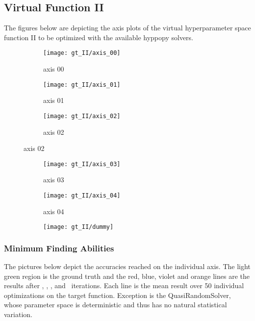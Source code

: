 \subsection{Virtual Function II}
The figures below are depicting the axis plots of the virtual hyperparameter space function II to be optimized with the available hyppopy solvers. 
\begin{figure}[h]
	\begin{subfigure}{0.32\textwidth}
		\texttt{[image: gt\_II/axis\_00]} 
		\caption{axis 00}
		\label{fig:axis00_II}
	\end{subfigure}
	\begin{subfigure}{0.32\textwidth}
		\texttt{[image: gt\_II/axis\_01]}
		\caption{axis 01}
		\label{fig:axis01_II}
	\end{subfigure}
	\begin{subfigure}{0.32\textwidth}
		\texttt{[image: gt\_II/axis\_02]}
		\caption{axis 02}
		\label{fig:axis02_II}
	\end{subfigure}
\end{figure}

\begin{figure}[h]
	\begin{subfigure}{0.32\textwidth}
		\texttt{[image: gt\_II/axis\_03]} 
		\caption{axis 03}
		\label{fig:axis03_II}
	\end{subfigure}
	\begin{subfigure}{0.32\textwidth}
		\texttt{[image: gt\_II/axis\_04]}
		\caption{axis 04}
		\label{fig:axis04_II}
	\end{subfigure}
	\begin{subfigure}{0.32\textwidth}
		\texttt{[image: gt\_II/dummy]}
		\caption{}
		\label{fig:dummy1_II}
	\end{subfigure}
\end{figure}


\newpage


\subsubsection{Minimum Finding Abilities}

The pictures below depict the accuracies reached on the individual axis. The light green region is the ground truth and the red, blue, violet and orange lines are the results after \myiterI, \myiterII, \myiterIII, and \myiterIV~iterations. Each line is the mean result over 50 individual optimizations on the target function. Exception is the QuasiRandomSolver, whose parameter space is deterministic and thus has no natural statistical variation. 

